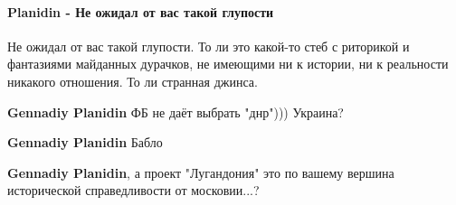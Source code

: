  
 
 
 
 
\paragraph{Planidin - Не ожидал от вас такой глупости}

\begin{itemize}
 
Не ожидал от вас такой глупости.
То ли это какой-то стеб с риторикой и фантазиями майданных дурачков, не имеющими ни к истории, ни к реальности никакого отношения.
То ли странная джинса.

\begin{itemize}
 
\textbf{Gennadiy Planidin} ФБ не даёт выбрать "днр"))) Украина?

 
\textbf{Gennadiy Planidin}
Бабло

 
\textbf{Gennadiy Planidin}, а проект "Лугандония" это по вашему вершина исторической справедливости от московии...?

 

\end{itemize}
\end{itemize}
